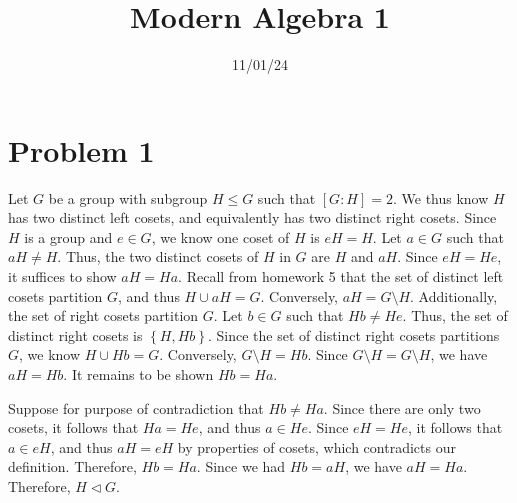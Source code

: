 \documentclass[11pt, letterpaper]{report}
\title{Modern Algebra 1}
\date{11/01/24}
\begin{document}
\makeproblem
\section*{Problem 1}
\begin{solution}
	Let $G$ be a group with subgroup $H\leq G$ such that $\left[ G:H \right] =2$. We thus know $H$ has two distinct left cosets, and equivalently has two distinct right cosets. Since $H$ is a group and $e\in G$, we know one coset of $H$ is $eH=H$. Let $a\in G$ such that $aH\neq H$. Thus, the two distinct cosets of $H$ in $G$ are $H$ and $aH$. Since $eH=He$, it suffices to show $aH=Ha$. Recall from homework 5 that the set of distinct left cosets partition $G$, and thus $H\cup aH=G$. Conversely, $aH=G\setminus H$. Additionally, the set of right cosets partition $G$. Let $b\in G$ such that $Hb\neq He$. Thus, the set of distinct right cosets is $\left\{ H,Hb \right\} $. Since the set of distinct right cosets partitions $G$, we know $H\cup Hb=G$. Conversely, $G\setminus H=Hb$. Since $G\setminus H=G \setminus H$, we have $aH=Hb$. It remains to be shown $Hb=Ha$.

	Suppose for purpose of contradiction that $Hb\neq Ha$. Since there are only two cosets, it follows that $Ha=He$, and thus $a\in He$. Since $eH=He$, it follows that $a\in eH$, and thus $aH=eH$ by properties of cosets, which contradicts our definition. Therefore, $Hb=Ha$. Since we had $Hb=aH$, we have $aH=Ha$. Therefore, $H\triangleleft G$.
\end{solution}
\end{document}
